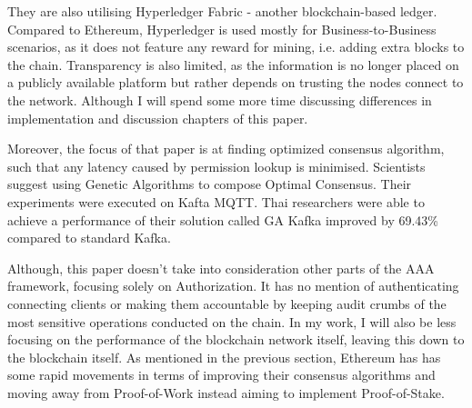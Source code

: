 They are also utilising Hyperledger Fabric - another blockchain-based ledger. Compared to Ethereum, Hyperledger \cite{cachin2016architecture} is used mostly for Business-to-Business scenarios, as it does not feature any reward for mining, i.e. adding extra blocks to the chain. Transparency is also limited, as the information is no longer placed on a publicly available platform but rather depends on trusting the nodes connect to the network. Although I will spend some more time discussing differences in implementation and discussion chapters of this paper.

Moreover, the focus of that paper is at finding optimized consensus algorithm, such that any latency caused by permission lookup is minimised. Scientists suggest using Genetic Algorithms to compose Optimal Consensus. Their experiments were executed on Kafta MQTT\cite{waehner_2019}. Thai researchers were able to achieve a performance of their solution called GA Kafka improved by 69.43\% compared to standard Kafka.

Although, this paper doesn't take into consideration other parts of the AAA framework, focusing solely on Authorization. It has no mention of authenticating connecting clients or making them accountable by keeping audit crumbs of the most sensitive operations conducted on the chain. In my work, I will also be less focusing on the performance of the blockchain network itself, leaving this down to the blockchain itself. As mentioned in the previous section, Ethereum has has some rapid movements in terms of improving their consensus algorithms and moving away from Proof-of-Work instead aiming to implement Proof-of-Stake.
